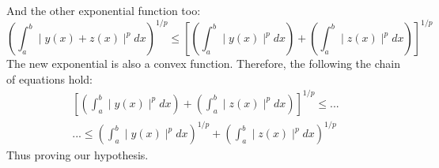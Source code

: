 \begin{itemize}
\begin{equation}
    \end{equation}
    And the other exponential function too:
    \begin{equation}
        \left( \int_a^b \mid y(x) + z(x) \mid ^p dx \right)^{1/p} \leq \left[ \left( \int_a^b \mid y(x) \mid ^p dx \right) + \left( \int_a^b \mid z(x) \mid ^p dx \right) \right] ^{1/p}
    \end{equation}
    The new exponential is also a convex function. Therefore, the following the chain of equations hold:
    \begin{align*}
        \left[ \left( \int_a^b \mid y(x) \mid ^p dx \right) + \left( \int_a^b \mid z(x) \mid ^p dx \right) \right] ^{1/p} \leq ... \\ ... \leq \left( \int_a^b \mid y(x) \mid ^p dx \right) ^{1/p} + \left( \int_a^b \mid z(x) \mid ^p dx \right) ^{1/p}
    \end{align*}
    Thus proving our hypothesis.
\end{itemize}
\QEDB

